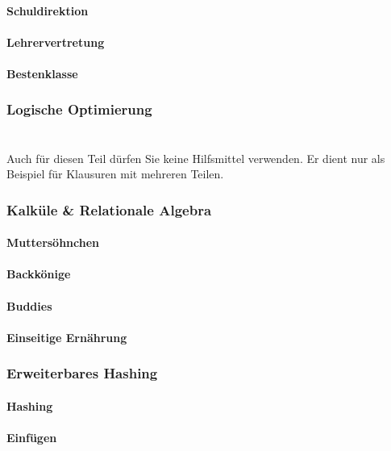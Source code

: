 \documentclass[exam, sectionseven, german]{acAssignment}
\begin{document}
\subsection{Schuldirektion}

\subsection{Lehrervertretung}

\subsection{Bestenklasse}

\section{Logische Optimierung}

\part{}
Auch für diesen Teil dürfen Sie keine Hilfsmittel verwenden.
Er dient nur als Beispiel für Klausuren mit mehreren Teilen.

\section{Kalküle \& Relationale Algebra}

\subsection{Muttersöhnchen}

\subsection{Backkönige}

\subsection{Buddies}

\subsection{Einseitige Ernährung}

\section{Erweiterbares Hashing}

\subsection{Hashing}

\subsection{Einfügen}

\end{document}
